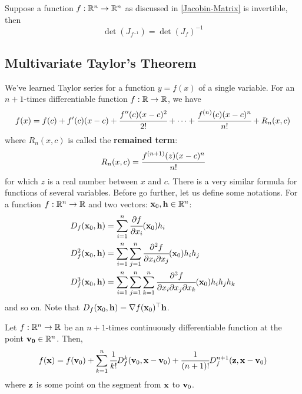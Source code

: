     \begin{Thm}
        Suppose a function $f:\mathbb{R}^n \to \mathbb{R}^n$ as discussed in \cref{Jacobin-Matrix} is invertible, then
        \begin{equation}
            \det(J_{f^{-1}}) = \det(J_f)^{-1}
        \end{equation}
    \end{Thm}


    \subsection{Multivariate Taylor's Theorem}
    We've learned Taylor series for a function $y = f(x)$ of a single variable. For an $n + 1$-times differentiable function $f : \mathbb{R} \to \mathbb{R}$, we have
    \begin{equation}
        f(x) = f(c) + f'(c)(x - c) + \cfrac{f''(c)(x - c)^2}{2!} + \cdots + \cfrac{f^{(n)}(c)(x - c)^n}{n!} + R_n(x, c)
    \end{equation}
    where $R_n(x, c)$ is called the \textbf{remained term}:
    \begin{equation}
        R_n(x ,c) = \cfrac{f^{(n+1)}(z)(x - c)^n}{n!}
    \end{equation}
    for which $z$ is a real number between $x$ and $c$.
    There is a very similar formula for functions of several variables. Before go further, let us define some notations. For a function $f:\mathbb{R}^n \to \mathbb{R}$ and  two vectors: $\mathbf{x}_0,\mathbf{h}\in \mathbb{R}^n$: 
    \begin{align*}
        D_f(\mathbf{x}_0, \mathbf{h}) &= \sum_{i = 1}^n \cfrac{\partial f}{\partial x_i}(\mathbf{x}_0) h_i\\
        D^2_f(\mathbf{x}_0, \mathbf{h}) &= \sum_{i = 1}^n\sum_{j = 1}^n \cfrac{\partial^2 f}{\partial x_i \partial x_j}(\mathbf{x}_0) h_ih_j\\
        D^3_f(\mathbf{x}_0, \mathbf{h}) &= \sum_{i = 1}^n\sum_{j = 1}^n\sum_{k = 1}^n \cfrac{\partial^3 f}{\partial x_i \partial x_j \partial x_k}(\mathbf{x}_0) h_ih_jh_k 
    \end{align*}
    and so on. Note that $D_f(\mathbf{x}_0, \mathbf{h}) = \nabla f(\mathbf{x}_0)^\top \mathbf{h}$.
    \begin{Thm}
        Let $f:\mathbb{R}^n \to \mathbb{R}$ be an $n + 1$-times continuously differentiable function at the point $\mathbf{v_0}\in \mathbb{R}^n$. Then, 
        \begin{equation*}
            f(\mathbf{x}) = f(\mathbf{v}_0) + \sum_{k = 1}^n \cfrac{1}{k!}D^k_{f}(\mathbf{v}_0, \mathbf{x} - \mathbf{v}_0) + \cfrac{1}{(n + 1)!}D^{n + 1}_f(\mathbf{z}, \mathbf{x} - \mathbf{v}_0)
        \end{equation*}
        where $\mathbf{z}$ is some point on the segment from $\mathbf{x}$ to $\mathbf{v}_0$.
    \end{Thm}
